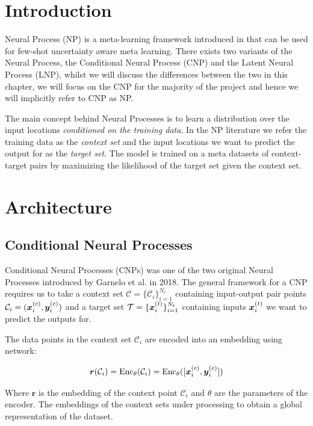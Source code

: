 \documentclass[../../main.tex]{subfiles}
\begin{document}
\section{Introduction}

Neural Process (NP) is a meta-learning framework introduced in \cite{garnelo2018conditional, garnelo2018neural} that can be used for few-shot uncertainty aware meta learning. There exists two variants of the Neural Process, the Conditional Neural Process (CNP) and the Latent Neural Process (LNP), whilst we will discuss the differences between the two in this chapter, we will focus on the CNP for the majority of the project and hence we will implicitly refer to CNP as NP. 

The main concept behind Neural Processes is to learn a distribution over the input locations \emph{conditioned on the training data}. In the NP literature we refer the training data as the \emph{context set} and the input locations we want to predict the output for as the \emph{target set}. The model is trained on a meta datasets of context-target pairs by maximizing the likelihood of the target set given the context set. 
\section{Architecture}

\subsection{Conditional Neural Processes}

Conditional Neural Processes (CNPs) \cite{garnelo2018conditional} was one of the two original Neural Processes introduced by Garnelo et al. in 2018. The general framework for a CNP requires us to take a context set $\mathcal{C} = \{ \mathcal{C}_i \}_{i=1}^{N_c}$ containing input-output pair points  $\mathcal{C}_i = (\bm{x}_{i}^{(c)}, \bm{y}_i^{(c)}) $ and a target set $\mathcal{T} = \{ \bm{x}_{i}^{(t)} \}_{i=1}^{N_t}$ containing inputs $\bm{x}_{i}^{(t)}$ we want to predict the outputs for.

The data points in the context set $\mathcal{C}_i$ are encoded into an embedding using network:


\begin{equation}
    \bm{r}(\mathcal{C}_i) = \text{Enc}_\theta(\mathcal{C}_i) = \text{Enc}_\theta( [\bm{x}_{i}^{(c)}, \bm{y}_i^{(c)}] )
\end{equation}

Where $\bm{r}$ is the embedding of the context point $\mathcal{C}_i$ and $\theta$ are the parameters of the encoder. The embeddings of the context sets under processing to obtain a global representation of the dataset. 
\end{document}
